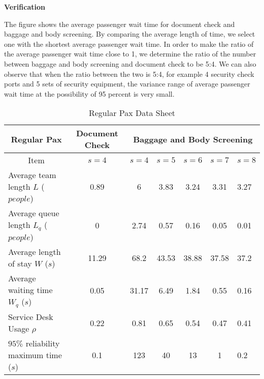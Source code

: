 \documentclass{mcmthesis}
\begin{document}
\par \textbf{Verification}
\par The figure shows the average passenger wait time for document check and baggage and body screening. By comparing the average length of time, we select one with the shortest average passenger wait time. In order to make the ratio of the average passenger wait time close to 1, we determine the ratio of the number between baggage and body screening and document check to be 5:4. We can also observe that when the ratio between the two is 5:4, for example 4 security check ports and 5 sets of security equipment, the variance range of average passenger wait time at the possibility of 95 percent is very small. 
\begin{table}[h]
\centering
\caption{Regular Pax Data Sheet}
\label{Modification 3-1}
\begin{tabular}{@{}l|c|ccccl@{}}
\toprule
\multicolumn{1}{c|}{Regular Pax}      & Document Check & \multicolumn{5}{c}{Baggage and Body Screening} \\ \midrule
\multicolumn{1}{c|}{Item}             & $s=4$          & $s=4$   & $s=5$   & $s=6$   & $s=7$   & $s=8$   \\ \midrule
Average team length $L$ ($people$)    & 0.89           & 6       & 3.83    & 3.24    & 3.31    & 3.27    \\
Average queue length $L_q$ ($people$) & 0              & 2.74    & 0.57    & 0.16    & 0.05    & 0.01    \\
Average length of stay $W$ ($s$)      & 11.29          & 68.2    & 43.53   & 38.88   & 37.58   & 37.2    \\
Average waiting time $W_q$ ($s$)      & 0.05           & 31.17   & 6.49    & 1.84    & 0.55    & 0.16    \\
Service Desk Usage $\rho$             & 0.22           & 0.81    & 0.65    & 0.54    & 0.47    & 0.41    \\
$95\%$ reliability maximum time ($s$) & 0.1            & 123     & 40      & 13      & 1       & 0.2     \\ \bottomrule
\end{tabular}
\end{table}
\end{document}
